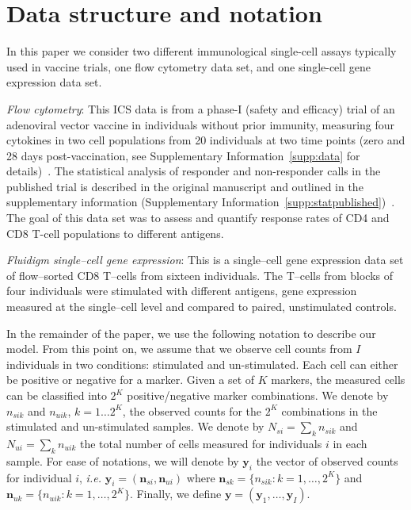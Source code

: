 \documentclass[11pt]{article}
\begin{document}
\section{Data structure and notation} 
In this paper we consider two different immunological single-cell assays typically used in vaccine trials, one flow cytometry data set, and one single-cell gene expression data set.

\textit{Flow cytometry}: This ICS data is from a phase-I (safety and efficacy) trial of an adenoviral vector vaccine in individuals without prior immunity, measuring four cytokines in two cell populations from 20 individuals at two time points (zero and 28 days post-vaccination, see Supplementary Information~\ref{supp:data} for details)~\cite{Peiperl:2010ej}. The statistical analysis of responder and non-responder calls in the published trial is described in the original manuscript and outlined in the supplementary information (Supplementary Information~\ref{supp:statpublished})~\cite{Peiperl:2010ej}. The goal of this data set was to assess and quantify response rates of CD4 and CD8 T-cell populations to different antigens.

\textit{Fluidigm single--cell gene expression}: This is a single--cell gene expression data set of flow--sorted CD8 T--cells from sixteen individuals. The T--cells from blocks of four individuals were stimulated with different antigens, gene expression measured at the single--cell level and compared to paired, unstimulated controls. 

In the remainder of the paper, we use the following notation to describe our model. 
From this point on, we assume that we observe cell counts from $I$ individuals in two conditions: stimulated and un-stimulated. Each cell can either be positive or negative for a marker. Given a set of $K$ markers, the measured cells can be classified into $2^K$ positive/negative marker combinations. We denote by $n_{sik}$ and $n_{uik}$, $k=1\dots 2^K$, the observed counts for the $2^K$ combinations in the stimulated and un-stimulated samples. We denote by $N_{si}=\sum_k n_{sik}$ and $N_{ui}=\sum_k n_{uik}$ the total number of cells measured for individuals $i$ in each sample. For ease of notations, we will denote by $\mathbf{y}_i$ the vector of observed counts for individual $i$, \textit{i.e.} $\mathbf{y}_{i}=(\mathbf{n}_{si}, \mathbf{n}_{ui})$ where $\mathbf{n}_{sk}=\{n_{sik}: k=1,\dots,2^K\}$ and $\mathbf{n}_{uk}=\{n_{uik}: k=1,\dots,2^K\}$. Finally, we define $\mathbf{y}=(\mathbf{y}_1,\dots,\mathbf{y}_I)$.
\end{document}
